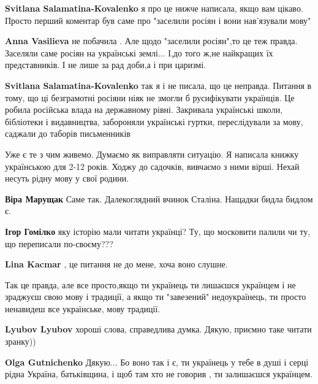 \begin{itemize}
\begin{itemize}
\textbf{Svitlana Salamatina-Kovalenko} я про це нижче написала, якщо вам цікаво. Просто перший коментар був саме про "заселили росіян і вони нав'язували мову"

\begin{itemize} %
\textbf{Anna Vasilieva} не побачила . Але щодо "заселили росіян",то це теж правда. Заселяли саме росіян на українські землі... І,до того ж,не найкращих їх представників. І не лише за рад доби,а і при царизмі.

\textbf{Svitlana Salamatina-Kovalenko} так я і не писала, що це неправда.
Питання в тому, що ці безграмотні росіяни ніяк не змогли б русифікувати українців. Це робила російська влада на державному рівні. Закривала українські школи, бібліотеки і видавництва, забороняли українські гуртки, переслідували за мову, саджали до таборів письменників
\end{itemize} %


Уже є те з чим живемо. Думаємо як виправляти ситуацію. Я написала книжку
українською для 2-12 років. Ходжу до садочків, вивчаємо з ними вірші. Нехай
несуть рідну мову у свої родини.


\textbf{Віра Марущак}
Саме так. Далекоглядний вчинок Сталіна.
Нащадки бидла бидлом є.

\textbf{Ігор Гомілко} яку історію мали читати українці? Ту, що московити палили чи ту, що переписали по-своєму???

\begin{itemize} %
\textbf{Lina Kacmar} , це питання не до мене, хоча воно слушне.
\end{itemize} %

\end{itemize} %


Так це правда, але все просто,якщо ти українець ти лишаєшся українцем і не
зраджуєш свою мову і традиції, а якщо ти "завезений" недоукраїнець, ти просто
ненавидеш все українське, мову традиції.

\begin{itemize} %
\textbf{Lyubov Lyubov} хороші слова, справедлива думка. Дякую, приємно таке читати зранку))

\begin{itemize} %
\textbf{Olga Gutnichenko} Дякую... Бо воно так і є, ти українець у тебе в душі і серці рідна Україна, батьківщина, і щоб там хто не говорив , ти залишаєшся українцем.
\end{itemize} %


\end{itemize}
\end{itemize}
